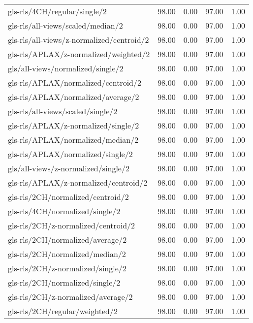 \begin{longtable}{lrrrr}
    gls-rls/4CH/regular/single/2              & 98.00 &  0.00 & 97.00 &  1.00 \\
    gls-rls/all-views/scaled/median/2         & 98.00 &  0.00 & 97.00 &  1.00 \\
    gls-rls/all-views/z-normalized/centroid/2 & 98.00 &  0.00 & 97.00 &  1.00 \\
    gls-rls/APLAX/z-normalized/weighted/2     & 98.00 &  0.00 & 97.00 &  1.00 \\
    gls/all-views/normalized/single/2         & 98.00 &  0.00 & 97.00 &  1.00 \\
    gls-rls/APLAX/normalized/centroid/2       & 98.00 &  0.00 & 97.00 &  1.00 \\
    gls-rls/APLAX/normalized/average/2        & 98.00 &  0.00 & 97.00 &  1.00 \\
    gls-rls/all-views/scaled/single/2         & 98.00 &  0.00 & 97.00 &  1.00 \\
    gls-rls/APLAX/z-normalized/single/2       & 98.00 &  0.00 & 97.00 &  1.00 \\
    gls-rls/APLAX/normalized/median/2         & 98.00 &  0.00 & 97.00 &  1.00 \\
    gls-rls/APLAX/normalized/single/2         & 98.00 &  0.00 & 97.00 &  1.00 \\
    gls/all-views/z-normalized/single/2       & 98.00 &  0.00 & 97.00 &  1.00 \\
    gls-rls/APLAX/z-normalized/centroid/2     & 98.00 &  0.00 & 97.00 &  1.00 \\
    gls-rls/2CH/normalized/centroid/2         & 98.00 &  0.00 & 97.00 &  1.00 \\
    gls-rls/4CH/normalized/single/2           & 98.00 &  0.00 & 97.00 &  1.00 \\
    gls-rls/2CH/z-normalized/centroid/2       & 98.00 &  0.00 & 97.00 &  1.00 \\
    gls-rls/2CH/normalized/average/2          & 98.00 &  0.00 & 97.00 &  1.00 \\
    gls-rls/2CH/normalized/median/2           & 98.00 &  0.00 & 97.00 &  1.00 \\
    gls-rls/2CH/z-normalized/single/2         & 98.00 &  0.00 & 97.00 &  1.00 \\
    gls-rls/2CH/normalized/single/2           & 98.00 &  0.00 & 97.00 &  1.00 \\
    gls-rls/2CH/z-normalized/average/2        & 98.00 &  0.00 & 97.00 &  1.00 \\
    gls-rls/2CH/regular/weighted/2            & 98.00 &  0.00 & 97.00 &  1.00 \\

\end{longtable}
